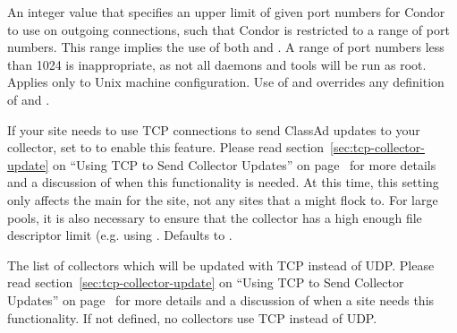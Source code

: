 \begin{description}
\label{param:OutHighPort}
\item[\Macro{OUT\_HIGHPORT}]
  An integer value that specifies an upper limit of given port numbers
  for Condor to use on outgoing connections,
  such that Condor is restricted to a range of port numbers.
  This range implies the use of both  and
  .
  A range of port numbers less than 1024 is inappropriate, as
  not all daemons and tools will be run as root.
  Applies only to Unix machine configuration.
  Use of  and  overrides
  any definition of  and .

\label{param:UpdateCollectorWithTcp}
\item[\Macro{UPDATE\_COLLECTOR\_WITH\_TCP}]
  If your site needs to use TCP connections to send ClassAd updates to
  your collector, set to 
  to enable this feature.
  Please read section~\ref{sec:tcp-collector-update} on ``Using TCP to
  Send Collector Updates'' on page~\pageref{sec:tcp-collector-update}
  for more details and a discussion of when this
  functionality is needed. 
  At this time, this setting only affects the main 
  for the site, not any sites that a  might flock to. 
  For large pools, it is also necessary to
  ensure that the collector has a high enough file descriptor limit
  (e.g. using .
  Defaults to .

\label{param:TcpUpdateCollectors}
\item[\Macro{TCP\_UPDATE\_COLLECTORS}]
  The list of collectors which will be updated with TCP instead of UDP.
  Please read section~\ref{sec:tcp-collector-update} on ``Using TCP to
  Send Collector Updates'' on page~\pageref{sec:tcp-collector-update}
  for more details and a discussion of when a site needs this
  functionality. 
  If not defined, no collectors use TCP instead of UDP.


\end{description}
